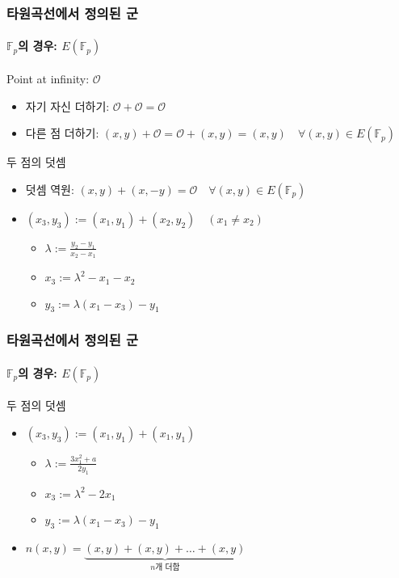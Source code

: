 \documentclass[aspectratio=169,mathserif]{beamer}
\newcommand{\Fp}{\mathbb{F}_p}
\begin{document}
  \begin{frame}
    \frametitle{타원곡선에서 정의된 군}
    \framesubtitle{\(\Fp\)의 경우: \(E(\Fp)\)}

    Point at infinity: \(\mathcal{O}\)
    \begin{itemize}
      \item 자기 자신 더하기: \(\mathcal{O} + \mathcal{O} = \mathcal{O}\)
      \item 다른 점 더하기: \((x,y) + \mathcal{O} = \mathcal{O} + (x,y) = (x,y)\quad\forall (x,y)\in E(\Fp)\)
    \end{itemize}
    \pause
    두 점의 덧셈
    \begin{itemize}
      \item 덧셈 역원: \((x,y) + (x,-y) = \mathcal{O}\quad\forall (x,y)\in E(\Fp)\)
      \item \((x_3,y_3) := (x_1,y_1) + (x_2,y_2)\quad(x_1\not=x_2)\)
      \pause
      \begin{itemize}
        \item \(\lambda := \frac{y_2-y_1}{x_2-x_1}\)
        \item \(x_3 := \lambda^2 - x_1 - x_2\)
        \item \(y_3 := \lambda(x_1 - x_3) - y_1\)
      \end{itemize}
    \end{itemize}
  \end{frame}

  \begin{frame}
    \frametitle{타원곡선에서 정의된 군}
    \framesubtitle{\(\Fp\)의 경우: \(E(\Fp)\)}

    두 점의 덧셈
    \begin{itemize}
      \item \((x_3,y_3) := (x_1,y_1) + (x_1,y_1)\)
      \pause
      \begin{itemize}
        \item \(\lambda := \frac{3x_1^2+a}{2y_1}\)
        \item \(x_3 := \lambda^2 - 2x_1\)
        \item \(y_3 := \lambda(x_1 - x_3) - y_1\)
      \end{itemize}
      \pause
      \item \(n(x,y)=\underbrace{(x,y) + (x,y) + \dots + (x,y)}_{n\text{개 더함}}\)
    \end{itemize}
  \end{frame}
\end{document}

